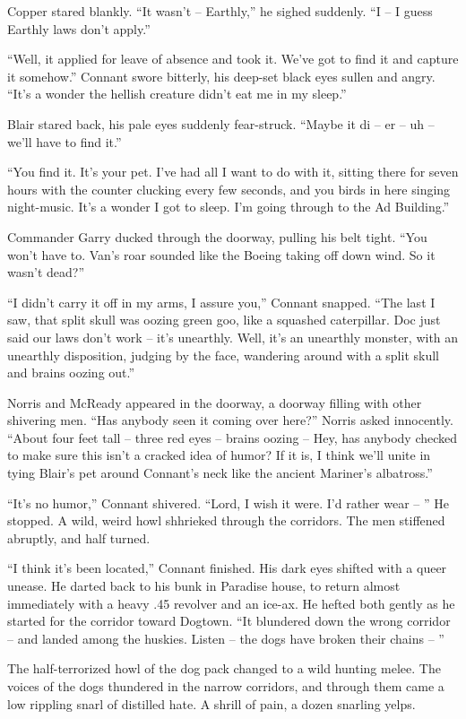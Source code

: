 \documentclass[letterpaper,openany,12pt]{memoir}		%
\begin{document}
Copper stared blankly. ``It wasn't -- Earthly,'' he sighed suddenly. ``I -- I
guess Earthly laws don't apply.''

``Well, it applied for leave of absence and took it. We've got to find it and
capture it somehow.'' Connant swore bitterly, his deep-set black eyes sullen and
angry. ``It's a wonder the hellish creature didn't eat me in my sleep.''

Blair stared back, his pale eyes suddenly fear-struck. ``Maybe it di -- er -- uh
-- we'll have to find it.''

``You find it. It's your pet. I've had all I want to do with it, sitting there
for seven hours with the counter clucking every few seconds, and you birds in
here singing night-music. It's a wonder I got to sleep. I'm going through to the
Ad Building.''

Commander Garry ducked through the doorway, pulling his belt tight. ``You won't
have to. Van's roar sounded like the Boeing taking off down wind. So it wasn't
dead?''

``I didn't carry it off in my arms, I assure you,'' Connant snapped. ``The last
I saw, that split skull was oozing green goo, like a squashed caterpillar. Doc
just said our laws don't work -- it's unearthly. Well, it's an unearthly
monster, with an unearthly disposition, judging by the face, wandering around
with a split skull and brains oozing out.''

Norris and McReady appeared in the doorway, a doorway filling with other
shivering men. ``Has anybody seen it coming over here?'' Norris asked
innocently. ``About four feet tall -- three red eyes -- brains oozing -- Hey,
has anybody checked to make sure this isn't a cracked idea of humor? If it is, I
think we'll unite in tying Blair's pet around Connant's neck like the ancient
Mariner's albatross.''

``It's no humor,'' Connant shivered. ``Lord, I wish it were. I'd rather wear --
'' He stopped. A wild, weird howl shhrieked through the corridors. The men
stiffened abruptly, and half turned.

``I think it's been located,'' Connant finished. His dark eyes shifted with a
queer unease. He darted back to his bunk in Paradise house, to return almost
immediately with a heavy .45 revolver and an ice-ax. He hefted both gently as he
started for the corridor toward Dogtown. ``It blundered down the wrong corridor
-- and landed among the huskies. Listen -- the dogs have broken their chains --
''

The half-terrorized howl of the dog pack changed to a wild hunting melee. The
voices of the dogs thundered in the narrow corridors, and through them came a
low rippling snarl of distilled hate. A shrill of pain, a dozen snarling yelps.
\end{document}
